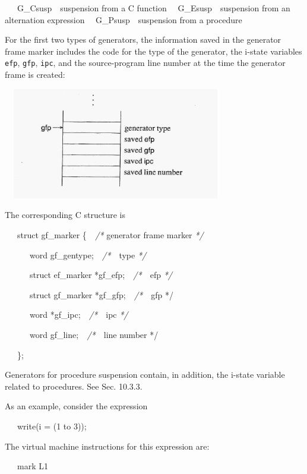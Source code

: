 \ \ \ G\_Csusp\ \ suspension from a C function\newline
 \ \ G\_Esusp\ \ suspension from an alternation expression\newline
 \ \ G\_Psusp\ \ suspension from a procedure


For the first two types of generators, the information saved in the
generator frame marker includes the code for the type of the
generator, the i-state variables \texttt{efp}, \texttt{gfp},
\texttt{ipc}, and the source-program line number at the time the
generator frame is created:


\ \  \includegraphics[width=3.6335in,height=1.9193in]{ib-img/ib-img066.jpg} 


The corresponding C structure is

{\ttfamily\mdseries
\ \ \ struct gf\_marker \{\textit{\ \ /* }generator frame marker \textit{*/}}

{\ttfamily\mdseries
\ \ \ \ \ \ word gf\_gentype;\textit{\ \ /*}\ \ type \textit{*/}}

{\ttfamily\mdseries
\ \ \ \ \ \ struct ef\_marker *gf\_efp;\textit{\ \ /*}\ \ efp \textit{*/}}

{\ttfamily\mdseries
\ \ \ \ \ \ struct gf\_marker *gf\_gfp;\textit{\ \ /*}\ \ gfp */}

{\ttfamily\mdseries
\ \ \ \ \ \ word *gf\_ipc;\textit{\ \ /*}\ \ ipc \textit{*/}}

{\ttfamily\mdseries
\ \ \ \ \ \ word gf\_line;\textit{\ \ /*}\ \ line number */}

{\ttfamily\mdseries
\ \ \ \};}


Generators for procedure suspension contain, in addition, the i-state
variable related to procedures. See Sec. 10.3.3.

As an example, consider the expression

{\ttfamily\mdseries
\ \ \ write(i = (1 to 3));}


The virtual machine instructions for this expression are:

{\ttfamily\mdseries
\ \ \ mark L1}

